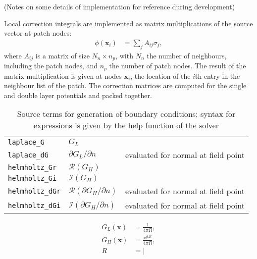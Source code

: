 \message{ !name(notes.tex)}\documentclass[a4paper,12pt]{article}
\newcommand{\E}{\mathrm{e}}
\newcommand{\J}{\mathrm{j}}
\newcommand{\imag}{\mathcal{I}}
\newcommand{\real}{\mathcal{R}}
\begin{document}


(Notes on some details of implementation for reference during development)


Local correction integrals are implemented as matrix multiplications
of the source vector at patch nodes:
\begin{align}
  \phi(\mathbf{x}_{i})
  &=
  \sum_{j} A_{ij}\sigma_{j},
\end{align}
where $A_{ij}$ is a matrix of size $N_{n}\times n_{p}$, with $N_{n}$
the number of neighbours, including the patch nodes, and $n_{p}$ the
number of patch nodes. The result of the matrix multiplication is
given at nodes $\mathbf{x}_{i}$, the location of the $i$th entry in
the neighbour list of the patch. The correction matrices are computed
for the single and double layer potentials and packed together. 

\begin{table}
  \centering
  \begin{tabular}{lll}
    \verb+laplace_G+  & $G_{L}$ & \\
    \verb+laplace_dG+ & $\partial G_{L}/\partial n$ & evaluated for
    normal at field point\\
    \verb+helmholtz_Gr+ & $\real (G_{H})$ & \\
    \verb+helmholtz_Gi+ & $\imag (G_{H})$ & \\
    \verb+helmholtz_dGr+ & $\real (\partial G_{H}/\partial n)$ &
    evaluated for normal at field point\\
    \verb+helmholtz_dGi+ & $\imag (\partial G_{H}/\partial n)$ &
    evaluated for normal at field point
  \end{tabular}
  \caption{Source terms for generation of boundary conditions; syntax
    for expressions is given by the help function of the solver}
  \label{tab:sources}
\end{table}

\begin{align}
  G_{L}(\mathbf{x}) &= \frac{1}{4\pi R},\\
  G_{H}(\mathbf{x}) &= \frac{\E{^{\J k R}}}{4\pi R},\\
  R &= |
\end{align}



\end{document}

